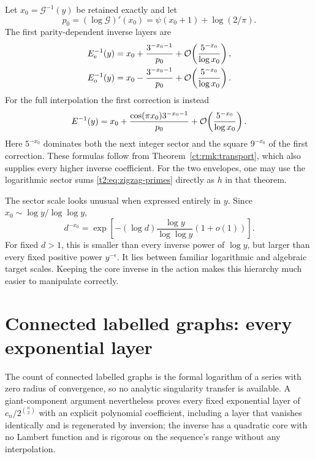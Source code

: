 \documentclass[11pt,openany]{book}
\numberwithin{equation}{chapter}
\theoremstyle{plain}
\theoremstyle{definition}
\theoremstyle{remark}
\begin{document}
Let $x_0=\mathcal G^{-1}(y)$ be retained exactly and let
\[
 p_0=(\log\mathcal G)'(x_0)=\psi(x_0+1)+\log(2/\pi).
\]
The first parity-dependent inverse layers are
\begin{align}
 E_{\mathrm e}^{-1}(y)&=x_0+\frac{3^{-x_0-1}}{p_0}
                  +\mathcal O\!\left(\frac{5^{-x_0}}{\log x_0}\right),\nonumber\\
 E_{\mathrm o}^{-1}(y)&=x_0-\frac{3^{-x_0-1}}{p_0}
                  +\mathcal O\!\left(\frac{5^{-x_0}}{\log x_0}\right).
 \label{t2:eq:zigzag-inverse-parity}
\end{align}
For the full interpolation the first correction is instead
\begin{equation}
 E^{-1}(y)=x_0+\frac{\cos(\pi x_0)3^{-x_0-1}}{p_0}
            +\mathcal O\!\left(\frac{5^{-x_0}}{\log x_0}\right).
 \label{t2:eq:zigzag-full-inverse}
\end{equation}
Here $5^{-x_0}$ dominates both the next integer sector and the square $9^{-x_0}$ of the first correction. These formulas follow from Theorem~\ref{ct:rmk:transport}, which also supplies every higher inverse coefficient. For the two envelopes, one may use the logarithmic sector sums \eqref{t2:eq:zigzag-primes} directly as $h$ in that theorem.

The sector scale looks unusual when expressed entirely in $y$. Since $x_0\sim\log y/\log\log y$,
\begin{equation}
 d^{-x_0}=\exp\left[-(\log d)\frac{\log y}{\log\log y}(1+o(1))\right].
 \label{t2:eq:zigzag-y-scale}
\end{equation}
For fixed $d>1$, this is smaller than every inverse power of $\log y$, but larger than every fixed positive power $y^{-\epsilon}$. It lies between familiar logarithmic and algebraic target scales. Keeping the core inverse in the action makes this hierarchy much easier to manipulate correctly.

\chapter{Connected labelled graphs: every exponential layer}
\label{ct:ch:graphs}

The count of connected labelled graphs is the formal logarithm of a series
with zero radius of convergence, so no analytic singularity transfer is
available.  A giant-component argument nevertheless proves every fixed
exponential layer of $c_n/2^{\binom n2}$ with an explicit polynomial
coefficient, including a layer that vanishes identically and is regenerated
by inversion; the inverse has a quadratic core with no Lambert function and
is rigorous on the sequence's range without any interpolation.
\end{document}
